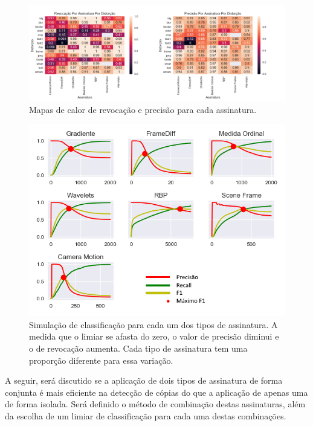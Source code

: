 \begin{figure}[h]
	\centering
	\caption{Mapas de calor de revocação e precisão para cada assinatura.}
	\label{fig:heatmap-lado-a-lado}
	\includegraphics[width=\textwidth]{dados/figuras/experimentos/heatmap_lado.png}
\end{figure}

\begin{figure}[h]
	\centering
	\caption{Simulação de classificação para cada um dos tipos de assinatura. A medida que o limiar se afasta do zero, o valor de precisão diminui e o de revocação aumenta. Cada tipo de assinatura tem uma proporção diferente para essa variação.}
	\label{fig:todos-limiares}
	\includegraphics[width=\textwidth]{dados/figuras/experimentos/todos_final.png}
\end{figure}
 
A seguir, será discutido se a aplicação de dois tipos de assinatura de forma conjunta é mais eficiente na detecção de cópias do que a aplicação de apenas uma de forma isolada. Será definido o método de combinação destas assinaturas, além da escolha de um limiar de classificação para cada uma destas combinações.

